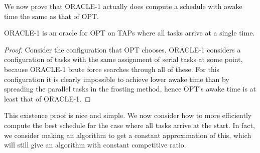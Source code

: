 We now prove that ORACLE-1 actually does compute a schedule with
awake time the same as that of OPT.
\begin{lemma}
  \label{lem:frosting} 
  ORACLE-1 is an oracle for OPT on TAPs where all tasks arrive at a single time.
\end{lemma}
\begin{proof}
  Consider the configuration that OPT chooses. ORACLE-1 considers
  a configuration of tasks with the same assignment of serial
  tasks at some point, because ORACLE-1 brute force searches
  through all of these. For this configuration it is clearly
  impossible to achieve lower awake time than by spreading the
  parallel tasks in the frosting method, hence OPT's awake time
  is at least that of ORACLE-1.
\end{proof}

This existence proof is nice and simple. We now consider how to
more efficiently compute the best schedule for the case where all
tasks arrive at the start. In fact, we consider making an
algorithm to get a constant approximation of this, which will
still give an algorithm with constant competitive ratio.



